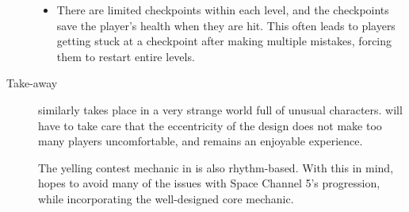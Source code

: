 \begin{description}
{\begin{itemize}
\item{There are limited checkpoints within each level, and the checkpoints save the player's health when they are hit. This often leads to players getting stuck at a checkpoint after making multiple mistakes, forcing them to restart entire levels.}
\end{itemize}
}
\item[Take-away]{\ourgame{} similarly takes place in a very strange world full of unusual characters. \ourteam{} will have to take care that the eccentricity of the design does not make too many players uncomfortable, and remains an enjoyable experience.

The yelling contest mechanic in \ourgame{} is also rhythm-based. With this in mind, \ourteam{} hopes to avoid many of the issues with Space Channel 5's progression, while incorporating the well-designed core mechanic.}
\end{description}


\clearpage
